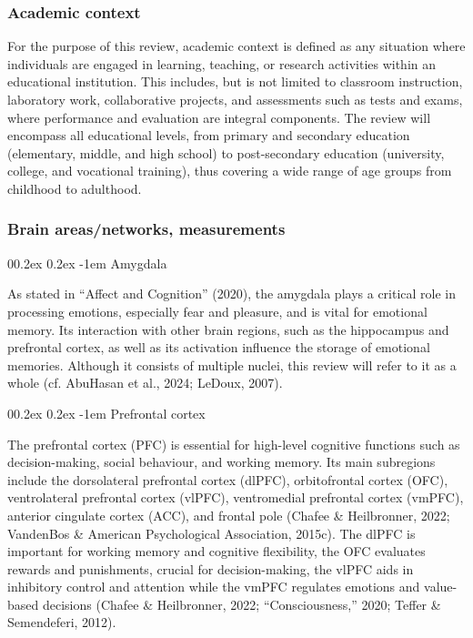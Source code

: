 \documentclass[
  stu, a4paper,floatsintext]{apa7}
\makeatletter
\let\oldparagraph\paragraph
\renewcommand{\paragraph}[1]{\oldparagraph{#1}\mbox{}}
\renewcommand{\paragraph}{\@startsection{paragraph}{4}{\parindent}%
  {0\baselineskip \@plus 0.2ex \@minus 0.2ex}%
  {-1em}%
  {\normalfont\normalsize\bfseries\itshape\typesectitle}}
\renewcommand{\paragraph}{\@startsection{paragraph}{4}{\parindent}%
  {0\baselineskip \@plus 0.2ex \@minus 0.2ex}%
  {-1em}%
  {\normalfont\normalsize\bfseries\typesectitle}}
\makeatother
\begin{document}
\subsubsection{Academic context}\label{academic-context}

For the purpose of this review, academic context is defined as any situation where individuals are engaged in learning, teaching, or research activities within an educational institution. This includes, but is not limited to classroom instruction, laboratory work, collaborative projects, and assessments such as tests and exams, where performance and evaluation are integral components. The review will encompass all educational levels, from primary and secondary education (elementary, middle, and high school) to post-secondary education (university, college, and vocational training), thus covering a wide range of age groups from childhood to adulthood.

\subsubsection{Brain areas/networks, measurements}\label{brain-areasnetworks-measurements}

\paragraph{Amygdala}\label{amygdala}

As stated in {``Affect and Cognition''} (2020), the amygdala plays a critical role in processing emotions, especially fear and pleasure, and is vital for emotional memory.
Its interaction with other brain regions, such as the hippocampus and prefrontal cortex, as well as its activation influence the storage of emotional memories.
Although it consists of multiple nuclei, this review will refer to it as a whole (cf. AbuHasan et al., 2024; LeDoux, 2007).

\paragraph{Prefrontal cortex}\label{prefrontal-cortex}

The prefrontal cortex (PFC) is essential for high-level cognitive functions such as decision-making, social behaviour, and working memory.
Its main subregions include the dorsolateral prefrontal cortex (dlPFC), orbitofrontal cortex (OFC), ventrolateral prefrontal cortex (vlPFC), ventromedial prefrontal cortex (vmPFC), anterior cingulate cortex (ACC), and frontal pole (Chafee \& Heilbronner, 2022; VandenBos \& American Psychological Association, 2015c).
The dlPFC is important for working memory and cognitive flexibility, the OFC evaluates rewards and punishments, crucial for decision-making, the vlPFC aids in inhibitory control and attention while the vmPFC regulates emotions and value-based decisions (Chafee \& Heilbronner, 2022; {``Consciousness,''} 2020; Teffer \& Semendeferi, 2012).
\end{document}
